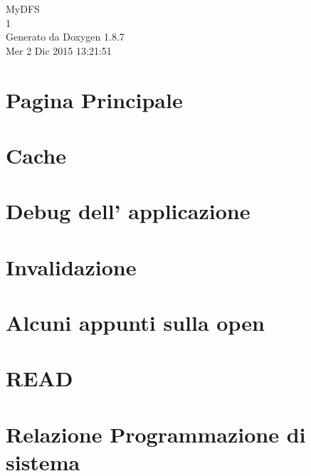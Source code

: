 \documentclass[twoside]{book}
\newcommand{\+}{\discretionary{\mbox{\scriptsize$\hookleftarrow$}}{}{}}
\newcommand{\clearemptydoublepage}{%
  \newpage{\pagestyle{empty}\cleardoublepage}%
}
\begin{document}
\hypersetup{pageanchor=false,
             bookmarks=true,
             bookmarksnumbered=true,
             pdfencoding=unicode
            }
\begin{titlepage}
\vspace*{7cm}
\begin{center}%
{\Large My\+D\+F\+S \\[1ex]\large 1 }\\
\vspace*{1cm}
{\large Generato da Doxygen 1.8.7}\\
\vspace*{0.5cm}
{\small Mer 2 Dic 2015 13:21:51}\\
\end{center}
\end{titlepage}
\clearemptydoublepage
\tableofcontents
\clearemptydoublepage
{}
\hypersetup{pageanchor=true}

\chapter{Pagina Principale}
\label{index}\hypertarget{index}{}
\chapter{Cache}
\label{md_Cache}
\hypertarget{md_Cache}{}

\chapter{Debug dell' applicazione}
\label{md_DEBUG}
\hypertarget{md_DEBUG}{}

\chapter{Invalidazione}
\label{md_Invalidazione}
\hypertarget{md_Invalidazione}{}

\chapter{Alcuni appunti sulla open}
\label{md_OPE}
\hypertarget{md_OPE}{}

\chapter{R\+E\+A\+D}
\label{md_READ}
\hypertarget{md_READ}{}

\chapter{Relazione Programmazione di sistema}
\label{md_relazione}
\hypertarget{md_relazione}{}

\end{document}

